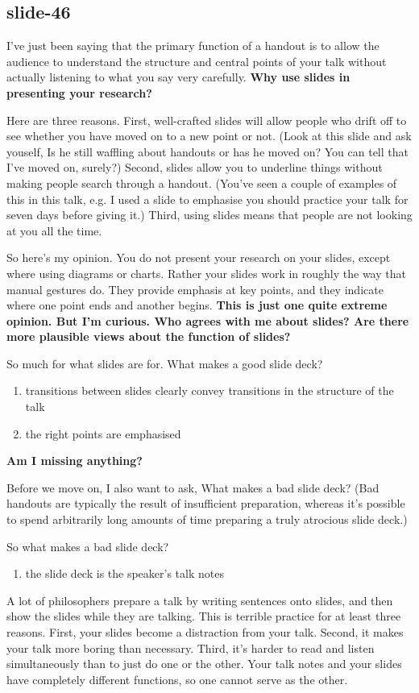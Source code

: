 \documentclass[12pt,\papersize]{extarticle}
\begin{document}
\subsection{slide-46}
I've just been saying that 
the primary function of a handout is to allow the audience to understand the structure and central
points of your talk without actually listening to what you say very carefully.
\textbf{Why use slides in presenting your research?}
 
Here are three reasons.
First, well-crafted slides will allow people who drift off to see whether you have moved on to a 
new point or not.
(Look at this slide and ask youself, Is he still waffling about handouts or has he moved on?  You can 
tell that I've moved on, surely?)
Second, slides allow you to underline things without making people search through a handout.
(You've seen a couple of examples of this in this talk, e.g. I used a slide to emphasise 
you should practice your talk for seven days before giving it.)
Third, using slides means that people are not looking at you all the time.
 
So here's my opinion.
You do not present your research on your slides, except where using diagrams or charts.
Rather your slides work in roughly the way that manual gestures do.
They provide emphasis at key points, and they indicate where one point ends and another begins.
\textbf{This is just one quite extreme opinion.  But I'm curious.  Who agrees with me about slides?  Are there more plausible views about the function of slides?}
 
So much for what slides are for.
What makes a good slide deck?
\begin{enumerate}
\item transitions between slides clearly convey transitions in the structure of the talk
\item the right points are emphasised
\end{enumerate}
\textbf{Am I missing anything?}
 
Before we move on, I also want to ask, What makes a bad slide deck?
(Bad handouts are typically the result of insufficient preparation, whereas it's possible to spend
arbitrarily long amounts of time preparing a truly atrocious slide deck.)
 
So what makes a bad slide deck?
\begin{enumerate}
\item the slide deck is the speaker's talk notes
\end{enumerate}
A lot of philosophers prepare a talk by writing sentences onto slides, and then show the slides
while they are talking.
This is terrible practice for at least three reasons.
First, your slides become a distraction from your talk.
Second, it makes your talk more boring than necessary.
Third, it's harder to read and listen simultaneously than to just do one or the other.
Your talk notes and your slides have completely different functions, so one cannot serve as the other.
\end{document}
